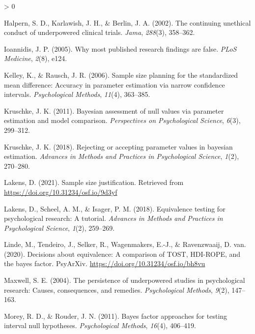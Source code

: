 \documentclass[
  english,
  man,floatsintext]{apa6}
\newlength{\cslhangindent}
\newenvironment{CSLReferences}[2] %
 {%
  \setlength{\parindent}{0pt}
  \ifodd #1 \everypar{\setlength{\hangindent}{\cslhangindent}}\ignorespaces\fi
  \ifnum #2 > 0
  \setlength{\parskip}{#2\baselineskip}
  \fi
 }%
 {}
\begin{document}
\hypertarget{refs}{}
\begin{CSLReferences}{1}{0}
\leavevmode\hypertarget{ref-halpern_continuing_2002}{}%
Halpern, S. D., Karlawish, J. H., \& Berlin, J. A. (2002). The continuing unethical conduct of underpowered clinical trials. \emph{Jama}, \emph{288}(3), 358--362.

\leavevmode\hypertarget{ref-ioannidis_why_2005}{}%
Ioannidis, J. P. (2005). Why most published research findings are false. \emph{{PLoS} Medicine}, \emph{2}(8), e124.

\leavevmode\hypertarget{ref-kelley_sample_2006}{}%
Kelley, K., \& Rausch, J. R. (2006). Sample size planning for the standardized mean difference: Accuracy in parameter estimation via narrow confidence intervals. \emph{Psychological Methods}, \emph{11}(4), 363--385.

\leavevmode\hypertarget{ref-kruschke_bayesian_2011}{}%
Kruschke, J. K. (2011). Bayesian assessment of null values via parameter estimation and model comparison. \emph{Perspectives on Psychological Science}, \emph{6}(3), 299--312.

\leavevmode\hypertarget{ref-kruschke_rejecting_2018}{}%
Kruschke, J. K. (2018). Rejecting or accepting parameter values in bayesian estimation. \emph{Advances in Methods and Practices in Psychological Science}, \emph{1}(2), 270--280.

\leavevmode\hypertarget{ref-lakens_sample_2021}{}%
Lakens, D. (2021). Sample size justification. Retrieved from \url{https://doi.org/10.31234/osf.io/9d3yf}

\leavevmode\hypertarget{ref-lakens_equivalence_2018}{}%
Lakens, D., Scheel, A. M., \& Isager, P. M. (2018). Equivalence testing for psychological research: A tutorial. \emph{Advances in Methods and Practices in Psychological Science}, \emph{1}(2), 259--269.

\leavevmode\hypertarget{ref-linde_tendeiro_selker_wagenmakers_van_ravenzwaaij_2020}{}%
Linde, M., Tendeiro, J., Selker, R., Wagenmakers, E.-J., \& Ravenzwaaij, D. van. (2020). Decisions about equivalence: A comparison of TOST, HDI-ROPE, and the bayes factor. PsyArXiv. \url{https://doi.org/10.31234/osf.io/bh8vu}

\leavevmode\hypertarget{ref-maxwell_persistence_2004}{}%
Maxwell, S. E. (2004). The persistence of underpowered studies in psychological research: Causes, consequences, and remedies. \emph{Psychological Methods}, \emph{9}(2), 147--163.

\leavevmode\hypertarget{ref-morey_bayes_2011}{}%
Morey, R. D., \& Rouder, J. N. (2011). Bayes factor approaches for testing interval null hypotheses. \emph{Psychological Methods}, \emph{16}(4), 406--419.


\end{CSLReferences}
\end{document}
